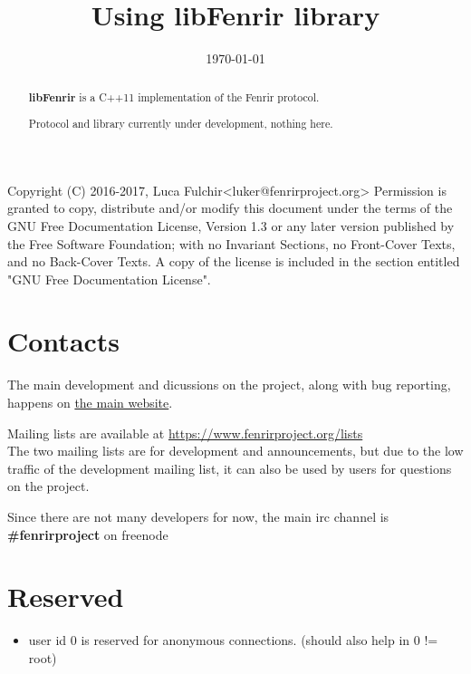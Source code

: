 \documentclass[11pt,a4paper]{refart}
\title{Using libFenrir library}
\date{\today}
\begin{document}
\maketitle

\begin{abstract}

\textbf{libFenrir} is a C++11 implementation of the Fenrir protocol.

Protocol and library currently under development, nothing here.

\end{abstract}

\vfill\hfill
\begin{verbbox}[\tiny]
Copyright (C)  2016-2017, Luca Fulchir<luker@fenrirproject.org>
Permission is granted to copy, distribute and/or modify this document
under the terms of the GNU Free Documentation License, Version 1.3
or any later version published by the Free Software Foundation;
with no Invariant Sections, no Front-Cover Texts, and no Back-Cover Texts.
A copy of the license is included in the section entitled "GNU
Free Documentation License".
\end{verbbox}
\theverbbox

\newpage
\tableofcontents
\newpage


\section{Contacts}

The main development and dicussions on the project, along with bug reporting, happens on
\href{https://www.fenrirproject.org/}{the main website}.

 Mailing lists are available at \href{https://www.fenrirproject.org/lists}{https://www.fenrirproject.org/lists}\\
The two mailing lists are for development and announcements, but due to the low traffic of the development mailing list, it
can also be used by users for questions on the project.

 Since there are not many developers for now, the main irc channel is \textbf{\#fenrirproject} on freenode




\section{Reserved}
\begin{itemize}
\item user id 0 is reserved for anonymous connections. (should also help in 0 != root)
\end{itemize}
\end{document}
